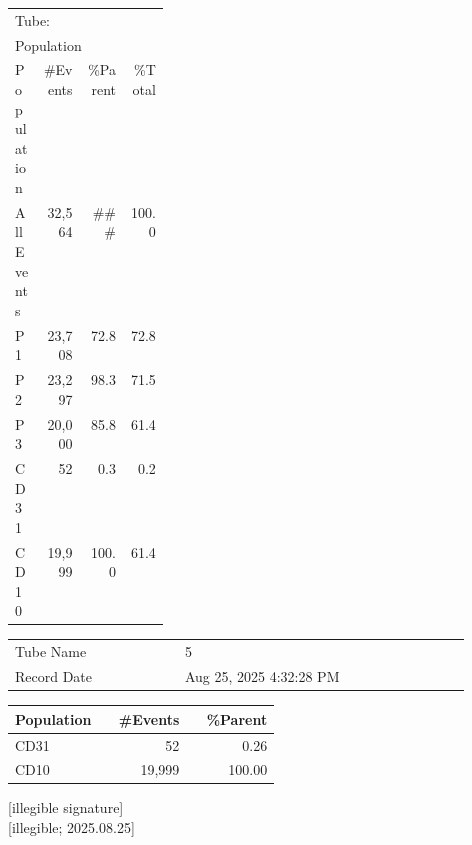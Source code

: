 \documentclass[UTF8,10pt,a4paper,fontset=fandol]{ctexart}
\newcommand{\handwritten}[1]{#1}
\begin{document}
\vspace{0.25cm}

\begin{center}
\small
\begin{tabular}{|p{0.18\linewidth}|r|r|r|}
\hline
\multicolumn{4}{|l|}{Tube:\quad 5}\\
\multicolumn{4}{|l|}{Population}\\
\hline
Population & \#Events & \%Parent & \%Total\\
\hline
All Events & 32,564 & \#\#\# & 100.0\\
P1 & 23,708 & 72.8 & 72.8\\
P2 & 23,297 & 98.3 & 71.5\\
P3 & 20,000 & 85.8 & 61.4\\
CD31 & 52 & 0.3 & 0.2\\
CD10 & 19,999 & 100.0 & 61.4\\
\hline
\end{tabular}
\end{center}

\vspace{0.25cm}

\begin{center}
\small
\begin{tabular}{|p{0.22\linewidth}|p{0.37\linewidth}|}
\hline
Tube Name & 5\\
Record Date & Aug 25, 2025 4:32:28 PM\\
\hline
\end{tabular}

\vspace{0.15cm}

\begin{tabular}{|p{0.34\linewidth}|r|r|}
\hline
Population & \#Events & \%Parent\\
\hline
CD31 & 52 & 0.26\\
CD10 & 19,999 & 100.00\\
\hline
\end{tabular}
\end{center}

\vfill

\begin{flushright}
\handwritten{[illegible signature]}\\[0.2cm]
\handwritten{[illegible; 2025.08.25]}
\end{flushright}
\end{document}

